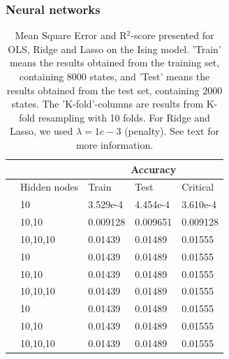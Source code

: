 \subsubsection{Neural networks}
\begin{table} [H]
	\caption{Mean Square Error and R$^2$-score presented for OLS, Ridge and Lasso on the Ising model. 'Train' means the results obtained from the training set, containing 8000 states, and 'Test' means the results obtained from the test set, containing 2000 states. The 'K-fold'-columns are results from K-fold resampling with 10 folds. For Ridge and Lasso, we used $\lambda=1e-3$ (penalty). See text for more information.}
	\begin{tabularx}{\textwidth}{l|l|XXX} \hline\hline
		\label{tab:nn}
		&& \multicolumn{3}{c}{\textbf{Accuracy}}\\ \hline
		&Hidden nodes&Train&Test&Critical\\ \hline
		
		\parbox[t]{2mm}{}
		&10 & 3.529e-4 & 4.454e-4 & 3.610e-4 \\
		&10,10 & 0.009128 & 0.009651 & 0.009128 \\
		&10,10,10 & 0.01439 & 0.01489 & 0.01555 \\ \hline
		
		\parbox[t]{2mm}{}
		&10 & 0.01439 & 0.01489 & 0.01555 \\
		&10,10 & 0.01439 & 0.01489 & 0.01555 \\
		&10,10,10 & 0.01439 & 0.01489 & 0.01555 \\ \hline
		
		\parbox[t]{2mm}{}
		&10 & 0.01439 & 0.01489 & 0.01555 \\
		&10,10 & 0.01439 & 0.01489 & 0.01555 \\
		&10,10,10 & 0.01439 & 0.01489 & 0.01555 \\ \hline\hline
	\end{tabularx}
\end{table}

